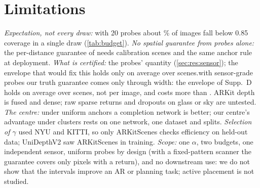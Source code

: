 \section{Limitations}
\label{sec:limitations}

\emph{Expectation, not every draw:} with 20 probes about \NumBetaShortOneTwenty\% of images fall below 0.85 coverage in a single draw (\cref{tab:budget}).
\emph{No spatial guarantee from probes alone:} the per-distance guarantee of \mDualBoth needs calibration scenes and the same anchor rule at deployment.
\emph{What is certified:} the probes' quantity (\cref{sec:res:sensor}); \ifenvelopemain the envelope that would fix this holds only on average over scenes.\else with sensor-grade probes our truth guarantee comes only through width: the envelope of Supp.~D holds on average over scenes, not per image, and costs more than \mDistBoth.\fi{} ARKit depth is fused and dense; raw sparse returns and dropouts on glass or sky are untested.
\emph{The centre:} under uniform anchors a completion network is better; our centre's advantage under clusters rests on one network, one dataset and \NumOmniSeeds{} splits.
\emph{Selection of $\gamma$} used NYU and KITTI, so only ARKitScenes checks efficiency on held-out data; UniDepthV2 saw ARKitScenes in training.
\emph{Scope:} one $\alpha$, two budgets, one independent sensor, uniform probes by design (with a fixed-pattern scanner the guarantee covers only pixels with a return), and no downstream use: we do not show that the intervals improve an AR or planning task; active placement is not studied.
